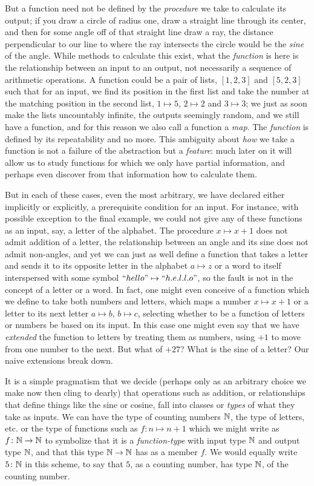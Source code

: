 \documentclass[11pt]{article}
\begin{document}
But a function need not be defined by the \emph{procedure} we take to calculate its output; if you draw a circle of radius one, draw a straight line through its center, and then for some angle off of that straight line draw a ray, the distance perpendicular to our line to where the ray intersects the circle would be the \emph{sine} of the angle. While methods to calculate this exist, what the \emph{function} is here is the relationship between an input to an output, not necessarily a sequence of arithmetic operations. A function could be a pair of lists, $[1,2,3]$ and $[5,2,3]$ such that for an input, we find its position in the first list and take the number at the matching position in the second list, $1 \mapsto 5$, $2 \mapsto 2$ and $3 \mapsto 3$; we just as soon make the lists uncountably infinite, the outputs seemingly random, and we still have a function, and for this reason we also call a function a \emph{map}. The \emph{function} is defined by its repeatability and no more. This ambiguity about \emph{how} we take a function is not a failure of the abstraction but a \emph{feature}: much later on it will allow us to study functions for which we only have partial information, and perhaps even discover from that information how to calculate them.

But in each of these cases, even the most arbitrary, we have declared either implicitly or explicitly, a prerequisite condition for an input. For instance, with possible exception to the final example, we could not give any of these functions as an input, say, a letter of the alphabet. The procedure $x \mapsto x + 1$ does not admit addition of a letter, the relationship between an angle and its sine does not admit non-angles, and yet we can just as well define a function that takes a letter and sends it to its opposite letter in the alphabet $a \mapsto z$ or a word to itself interspersed with some symbol $``hello" \mapsto ``h.e.l.l.o"$, so the fault is not in the concept of a letter or a word. In fact, one might even conceive of a function which we define to take both numbers and letters, which maps a number $x \mapsto x + 1$ or a letter to its next letter $a \mapsto b$, $b \mapsto c$, selecting whether to be a function of letters or numbers be based on its input. In this case one might even say that we have \emph{extended} the function to letters by treating them as numbers, using $+1$ to move from one number to the next. But what of $+27$? What is the sine of a letter? Our naive extensions break down.

It is a simple pragmatism that we decide (perhaps only as an arbitrary choice we make now then cling to dearly) that operations such as addition, or relationships that define things like the sine or cosine, fall into classes or \emph{types} of what they take as inputs. We can have the type of counting numbers $\mathbb{N}$, the type of letters, etc. or the type of functions such as $f\colon n \mapsto n + 1$ which we might write as $f\colon \mathbb{N} \to \mathbb{N}$ to symbolize that it is a \emph{function-type} with input type $\mathbb{N}$ and output type $\mathbb{N}$, and that this type $\mathbb{N} \to \mathbb{N}$ has as a member $f$. We would equally write $5 \colon \mathbb{N}$ in this scheme, to say that $5$, as a counting number, has type $\mathbb{N}$, of the counting number.
\end{document}
